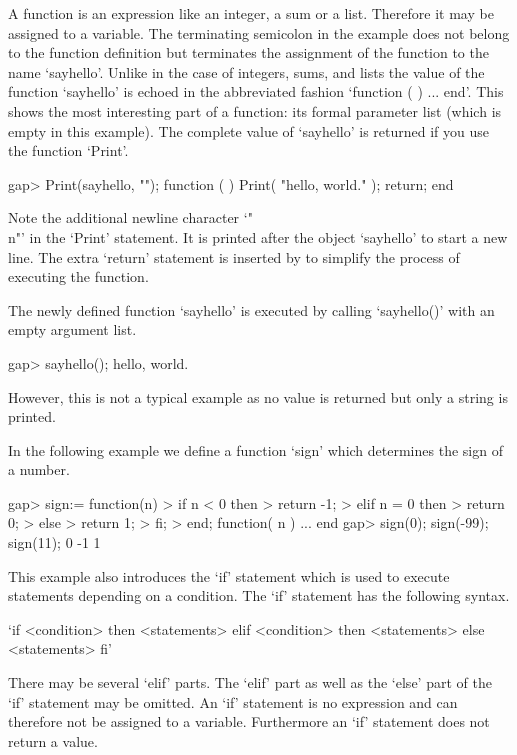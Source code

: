 A {\GAP} function is an expression  like an integer,  a sum or a list.
Therefore it may be assigned to a variable.  The terminating semicolon
in the  example   does not belong    to the  function  definition  but
terminates the  assignment  of the  function to the  name  `sayhello'.
Unlike in the case   of integers, sums, and  lists  the value of   the
function `sayhello' is echoed in the abbreviated fashion `function ( )
...   end'.  This shows the most  interesting part  of a function: its
formal parameter list (which is empty  in this example).  The complete
value of `sayhello' is returned if you use the function `Print'.

\beginexample
gap> Print(sayhello, "\n");
function (  )
    Print( "hello, world.\n" );
    return;
end
\endexample

Note  the  additional   newline  character   `"\\n"'  in  the  `Print'
statement.  It is  printed after the object  `sayhello' to start a new
line. The extra `return'  statement is inserted  by {\GAP} to simplify
the process of executing the function.

The newly defined function `sayhello' is executed by calling `sayhello()'
with an empty argument list.

\beginexample
gap> sayhello();
hello, world.
\endexample

However, this is not a typical example as no  value is returned but only a
string is printed.


In the following example we define a function `sign' which determines
the sign of a number.

\beginexample
gap> sign:= function(n)
>        if n < 0 then
>           return -1;
>        elif n = 0 then
>           return 0;
>        else
>           return 1;
>        fi;
>    end;
function( n ) ... end
gap> sign(0); sign(-99); sign(11);
0
-1
1
\endexample

This example also introduces the `if' statement which is  used to execute
statements  depending  on  a  condition.   The  `if'  statement  has  the
following syntax.

\fmark`if <condition> then
    <statements>
elif <condition> then
    <statements>
else
    <statements>
fi'

There may be several `elif' parts.  The `elif' part as well as the `else'
part  of the  `if' statement may be omitted.   An  `if'  statement  is no
expression and  can therefore not be assigned to a variable.  Furthermore
an `if' statement does not return a value.

